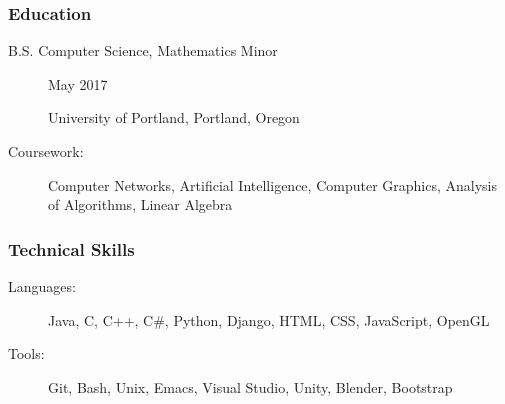 \documentclass{article}
\begin{document}
\subsubsection*{Education}
    \begin{description}
        \item[B.S. Computer Science, Mathematics Minor]\hfill May 2017

        University of Portland, Portland, Oregon

        \vspace{0.5em}

        \item[Coursework:]
            Computer Networks, 
            Artificial Intelligence, 
            Computer Graphics, 
            Analysis of Algorithms,
            Linear Algebra
    \end{description}



\subsubsection*{Technical Skills}
    \begin{description}    
        \item[Languages:] 
            Java, 
            C, 
            C++, 
            C\#, 
            Python, 
            Django, 
            HTML, 
            CSS, 
            JavaScript, 
            OpenGL

            \vspace{0.5em}

        \item[Tools:] 
            Git, 
            Bash, 
            Unix, 
            Emacs, 
            Visual Studio, 
            Unity, 
            Blender, 
            Bootstrap

    \end{description}
\end{document}
